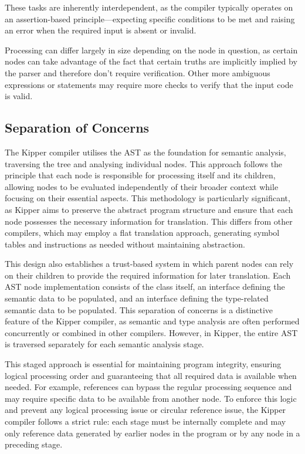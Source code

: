 These tasks are inherently interdependent, as the compiler typically operates on an assertion-based principle—expecting specific conditions to be met and raising an error when the required input is absent or invalid.

Processing can differ largely in size depending on the node in question, as certain nodes can take advantage of the fact that certain truths are implicitly implied by the parser and therefore don't require verification. Other more ambiguous expressions or statements may require more checks to verify that the input code is valid.

\subsection{Separation of Concerns}
\label{sec:separation-of-concerns}

The Kipper compiler utilises the AST as the foundation for semantic analysis, traversing the tree and analysing individual nodes. This approach follows the principle that each node is responsible for processing itself and its children, allowing nodes to be evaluated independently of their broader context while focusing on their essential aspects. This methodology is particularly significant, as Kipper aims to preserve the abstract program structure and ensure that each node possesses the necessary information for translation. This differs from other compilers, which may employ a flat translation approach, generating symbol tables and instructions as needed without maintaining abstraction.

This design also establishes a trust-based system in which parent nodes can rely on their children to provide the required information for later translation. Each AST node implementation consists of the class itself, an interface defining the semantic data to be populated, and an interface defining the type-related semantic data to be populated. This separation of concerns is a distinctive feature of the Kipper compiler, as semantic and type analysis are often performed concurrently or combined in other compilers. However, in Kipper, the entire AST is traversed separately for each semantic analysis stage.

This staged approach is essential for maintaining program integrity, ensuring logical processing order and guaranteeing that all required data is available when needed. For example, references can bypass the regular processing sequence and may require specific data to be available from another node. To enforce this logic and prevent any logical processing issue or circular reference issue, the Kipper compiler follows a strict rule: each stage must be internally complete and may only reference data generated by earlier nodes in the program or by any node in a preceding stage.

